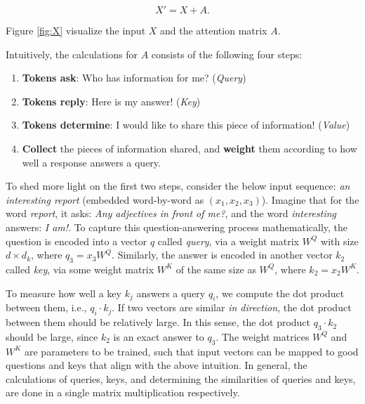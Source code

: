 $$
X' = X+A.
$$

Figure \ref{fig:X} visualize the input $X$ and the attention matrix $A$.

Intuitively, the calculations for $A$ consists of the following four steps:

\begin{enumerate}
    \item \textbf{Tokens ask}: Who has information for me? (\textit{Query})
    \item \textbf{Tokens reply}: Here is my answer! (\textit{Key})
    \item \textbf{Tokens determine}: I would like to share this piece of information! (\textit{Value})
    \item \textbf{Collect} the pieces of information shared, and \textbf{weight} them according to how well a response answers a query.
\end{enumerate}

To shed more light on the first two steps, consider the below input sequence: \textit{an interesting report} (embedded word-by-word as $(x_1, x_2, x_3)$). Imagine that for the word \textit{report}, it asks: \textit{Any adjectives in front of me?}, and the word \textit{interesting} answers: \textit{I am!}. To capture this question-answering  process mathematically, the question is encoded into a vector $q$ called \textit{query}, via a weight matrix $W^Q$ with size ${d \times d_k}$, where $q_3 = x_3  W^Q.$ Similarly, the answer is encoded in another vector $k_2$ called \textit{key}, via some weight matrix $W^K$ of the same size as $W^Q$, where $k_2 = x_2 W^K$.

To measure how well a key $k_j$ answers a query $q_i$, we compute the dot product between them, i.e., $q_i \cdot k_j$. If two vectors are similar \textit{in direction}, the dot product between them should be relatively large. In this sense, the dot product $q_3 \cdot k_2$ should be large, since $k_2$ is an exact answer to $q_3$. The weight matrices $W^Q$ and $W^K$ are parameters to be trained, such that input vectors can be mapped to good questions and keys that align with the above intuition. In general, the calculations of queries, keys, and determining the similarities of queries and keys, are done in a single matrix multiplication respectively. 


